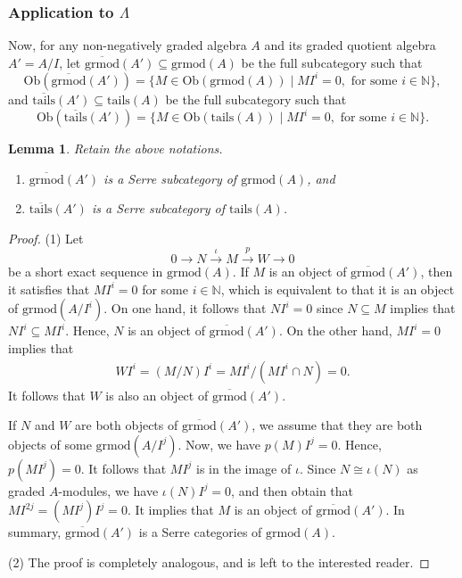 \documentclass[11pt,reqno]{amsart}
\newtheorem{lemma}[theorem]{Lemma}
\theoremstyle{definition}
\begin{document}
\subsubsection{Application to $\Lambda$}\label{sjcbnhu}

 
Now, for any non-negatively graded algebra $A$ and its graded quotient 
algebra $A' = A/I$, 
let $\overline{\mathrm{grmod}}(A') \subseteq \mathrm{grmod}(A)$ 
be the full subcategory such that 
$$
\mathrm{Ob}( \overline{\mathrm{grmod}}(A') ) 
= \big\{ M \in \mathrm{Ob}(\mathrm{grmod}(A) ) \mid M I^{i} = 0, \,\,
\mbox{for some} \,\, i \in \mathbb{N}  \big\}, 
$$
and $\overline{\mathrm{tails}}(A') \subseteq \mathrm{tails}(A)$ be the 
full subcategory such that 
$$
\mathrm{Ob}( \overline{\mathrm{tails}}(A') ) 
= \big\{ M \in  \mathrm{Ob}(\mathrm{tails}(A) ) \mid M I^{i} = 0, \,\,
\mbox{for some}\,\, i \in \mathbb{N}  \big\}. 
$$ 

\begin{lemma}\label{ToAbel}Retain the above notations.
\begin{enumerate}\item[$(1)$]
$\overline{\mathrm{grmod}}(A')$ is a Serre subcategory of 
$\mathrm{grmod}(A)$, and

\item[$(2)$]
$\overline{\mathrm{tails}}(A')$ is a Serre subcategory of 
$\mathrm{tails}(A)$.
\end{enumerate}
\end{lemma}

\begin{proof}
(1) Let 
$$
0 \longrightarrow N \stackrel{\iota}
\longrightarrow M \stackrel{p}
\longrightarrow W \longrightarrow 0 
$$ 
be a short exact sequence in $\mathrm{grmod}(A)$.  
 If $M$ is an object of $\overline{\mathrm{grmod}}(A')$, then it satisfies that 
 $M I^i = 0$ 
 for some $i \in \mathbb{N}$, 
 which is equivalent to that it is an object 
 of $\mathrm{grmod}(A / I^i )$. On one hand, 
 it follows that $N I^i = 0$ 
 since $N \subseteq M$ implies that $ N I^i \subseteq M I^i$. 
 Hence, $N$ is an object of $\overline{\mathrm{grmod}}(A')$. 
On the other hand, $M I^i = 0$ implies that 
\begin{align*}
W I^i  = (M / N) I^i 
 = M I^i /  (M I^i \cap N ) 
 = 0. 
\end{align*}
It follows that $W$ is also an object of $\overline{\mathrm{grmod}}(A')$. 

If $N$ and $W$ are both objects of $\overline{\mathrm{grmod}}(A')$, 
we assume that they are both objects of some 
$\mathrm{grmod}(A / I^j )$. Now, we have $p(M)I^j = 0$. 
Hence, $p(M I^j) = 0$.
It follows that $M I^j$ is in the image of $\iota$. Since $N \cong \iota(N)$ 
as graded $A$-modules, 
we have $\iota(N) I^j = 0$, and then obtain that $M I^{2j} =  (M I^{j})I^{j}= 0$. 
It implies that $M$
is an object of $\overline{\mathrm{grmod}}(A')$. In summary, 
$\overline{\mathrm{grmod}}(A')$ is a Serre categories of
$\mathrm{grmod}(A)$. 

(2) The proof is completely analogous, and is left to the interested reader.
\end{proof}
\end{document}
